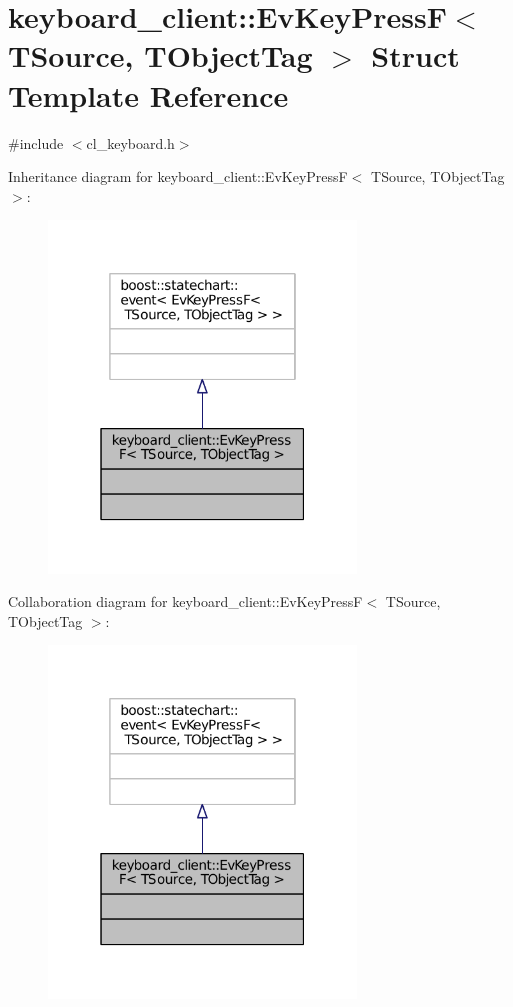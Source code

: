 \hypertarget{structkeyboard__client_1_1EvKeyPressF}{}\section{keyboard\+\_\+client\+:\+:Ev\+Key\+PressF$<$ T\+Source, T\+Object\+Tag $>$ Struct Template Reference}
\label{structkeyboard__client_1_1EvKeyPressF}


{\ttfamily \#include $<$cl\+\_\+keyboard.\+h$>$}



Inheritance diagram for keyboard\+\_\+client\+:\+:Ev\+Key\+PressF$<$ T\+Source, T\+Object\+Tag $>$\+:
\nopagebreak
\begin{figure}[H]
\begin{center}
\leavevmode
\includegraphics[width=232pt]{structkeyboard__client_1_1EvKeyPressF__inherit__graph}
\end{center}
\end{figure}


Collaboration diagram for keyboard\+\_\+client\+:\+:Ev\+Key\+PressF$<$ T\+Source, T\+Object\+Tag $>$\+:
\nopagebreak
\begin{figure}[H]
\begin{center}
\leavevmode
\includegraphics[width=232pt]{structkeyboard__client_1_1EvKeyPressF__coll__graph}
\end{center}
\end{figure}


